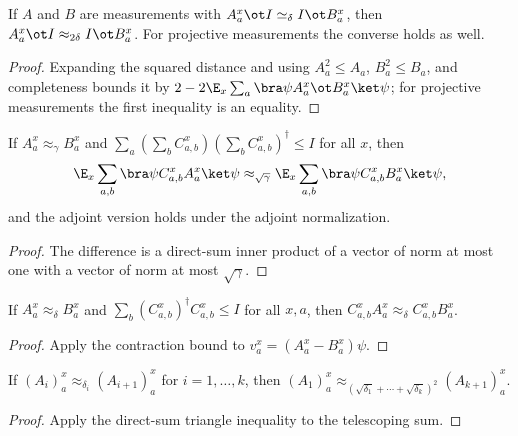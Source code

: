 \begin{proposition}\label{prop:simeq-to-approx}
	\leanok
	If $A$ and $B$ are measurements with $A^x_a\ot I\simeq_\delta I\ot B^x_a$,
	then $A^x_a\ot I\approx_{2\delta}I\ot B^x_a$.  For projective
	measurements the converse holds as well.
\end{proposition}
\begin{proof}
	\leanok
	Expanding the squared distance and using $A_a^2\le A_a$, $B_a^2\le B_a$,
	and completeness bounds it by $2-2\E_x\sum_a\bra\psi A_a^x\ot B_a^x\ket\psi$;
	for projective measurements the first inequality is an equality.
\end{proof}

\begin{proposition}\label{prop:closeness-of-ip}
	\leanok
	If $A^x_a\approx_\gamma B^x_a$ and
	$\sum_a(\sum_bC^x_{a,b})(\sum_bC^x_{a,b})^\dagger\le I$ for all $x$, then
	\[
		\E_x\sum_{a,b}\bra\psi C^x_{a,b}A^x_a\ket\psi
		\approx_{\sqrt\gamma}
		\E_x\sum_{a,b}\bra\psi C^x_{a,b}B^x_a\ket\psi,
	\]
	and the adjoint version holds under the adjoint normalization.
\end{proposition}
\begin{proof}
	\leanok
	The difference is a direct-sum inner product of a vector of norm at most
	one with a vector of norm at most $\sqrt\gamma$.
\end{proof}

\begin{proposition}\label{prop:cab-approx-delta}
	\leanok
	If $A^x_a\approx_\delta B^x_a$ and $\sum_b(C^x_{a,b})^\dagger C^x_{a,b}\le I$
	for all $x,a$, then $C^x_{a,b}A^x_a\approx_\delta C^x_{a,b}B^x_a$.
\end{proposition}
\begin{proof}
	\leanok
	Apply the contraction bound to $v^x_a=(A^x_a-B^x_a)\psi$.
\end{proof}

\begin{proposition}\label{prop:triangle-inequality-for-approx_delta}
	\leanok
	If $(A_i)^x_a\approx_{\delta_i}(A_{i+1})^x_a$ for $i=1,\ldots,k$, then
	$(A_1)^x_a\approx_{(\sqrt{\delta_1}+\cdots+\sqrt{\delta_k})^2}(A_{k+1})^x_a$.
\end{proposition}
\begin{proof}
	\leanok
	Apply the direct-sum triangle inequality to the telescoping sum.
\end{proof}

